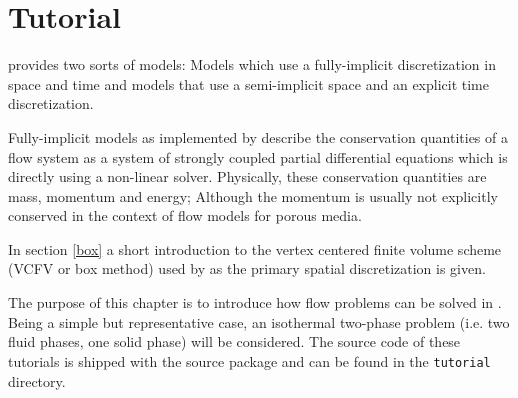 \chapter[Tutorial]{Tutorial}\label{chp:tutorial}

\eWoms provides two sorts of models: Models which use a fully-implicit
discretization in space and time and models that use a
semi-implicit space and an explicit time discretization.

Fully-implicit models as implemented by \eWoms describe the
conservation quantities of a flow system as a system of strongly
coupled partial differential equations which is directly using a
non-linear solver. Physically, these conservation quantities are mass,
momentum and energy; Although the momentum is usually not explicitly
conserved in the context of flow models for porous media.

In section \ref{box} a short introduction to the vertex centered
finite volume scheme (VCFV or box method) used by \eWoms as the
primary spatial discretization is given.

The purpose of this chapter is to introduce how flow problems can be
solved in \eWoms.  Being a simple but representative case, an
isothermal two-phase problem (i.e. two fluid phases, one solid phase)
will be considered. The source code of these tutorials is shipped with
the \eWoms source package and can be found in the \texttt{tutorial}
directory.



